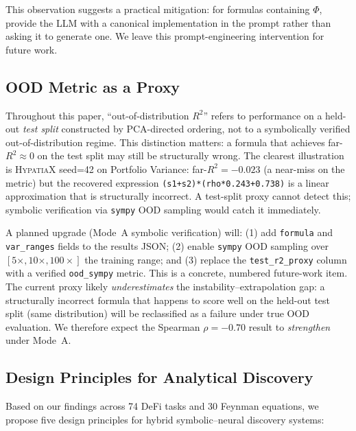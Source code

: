 \documentclass[twoside,11pt]{article}
\newcommand{\Rsq}{R^{2}}
\begin{document}
This observation suggests a practical mitigation: for formulas containing $\Phi$,
provide the LLM with a canonical implementation in the prompt rather than asking it
to generate one.  We leave this prompt-engineering intervention for future work.

\subsection{OOD Metric as a Proxy}\label{subsec:ood-metric-as-a-proxy}
\label{sec:ood_proxy}

Throughout this paper, ``out-of-distribution $\Rsq$'' refers to performance on a
held-out \emph{test split} constructed by PCA-directed ordering, not to a
symbolically verified out-of-distribution regime.  This distinction matters: a
formula that achieves far-$\Rsq \approx 0$ on the test split may still be
structurally wrong.  The clearest illustration is \textsc{HypatiaX} seed=42 on
Portfolio Variance: far-$\Rsq = -0.023$ (a near-miss on the metric) but the
recovered expression \texttt{(s1+s2)*(rho*0.243+0.738)} is a linear approximation
that is structurally incorrect.  A test-split proxy cannot detect this; symbolic
verification via \texttt{sympy} OOD sampling would catch it immediately.

A planned upgrade (Mode~A symbolic verification) will: (1) add \texttt{formula} and
\texttt{var\_ranges} fields to the results JSON; (2) enable \texttt{sympy} OOD
sampling over $[5\times, 10\times, 100\times]$ the training range; and (3) replace
the \texttt{test\_r2\_proxy} column with a verified \texttt{ood\_sympy} metric.
This is a concrete, numbered future-work item.  The current proxy likely
\emph{underestimates} the instability--extrapolation gap: a structurally incorrect
formula that happens to score well on the held-out test split (same distribution)
will be reclassified as a failure under true OOD evaluation.  We therefore
expect the Spearman $\rho=-0.70$ result to \emph{strengthen} under Mode~A.

\subsection{Design Principles for Analytical Discovery}\label{subsec:design-principles-for-analytical-discove}
\label{sec:disc_principles}

Based on our findings across 74 DeFi tasks and 30 Feynman equations, we propose five design principles for hybrid symbolic--neural discovery systems:
\end{document}
